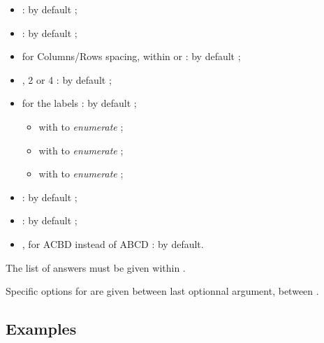\documentclass[english,11pt,a4paper]{article}
\begin{document}
\begin{itemize}
	\item {} :  by default ;
	\item {}  :  by default ;
	\item {} for Columns/Rows spacing, within  or  : \MontreCode{6pt/2pt} by default ;
	\item {}, 2 or 4 :  by default ;
	\item {} for the labels :  by default ;
	\begin{itemize}
		\item with  to \textit{enumerate}  ;
		\item with  to \textit{enumerate}  ;
		\item with  to \textit{enumerate}  ;
	\end{itemize}
	\item {} :  by default ;
	\item {} :  by default ;
	\item {}, for ACBD instead of ABCD :  by default.
\end{itemize}

The list of answers must be given within .

Specific options for  are given between last optionnal argument, between .

\subsection{Examples}

\begin{demohigh}[language=latex/latex3,style/main=teal!25,style/code=teal!25]
\end{demohigh}

\begin{demohigh}[language=latex/latex3,style/main=teal!25,style/code=teal!25]
\end{demohigh}
\end{document}
